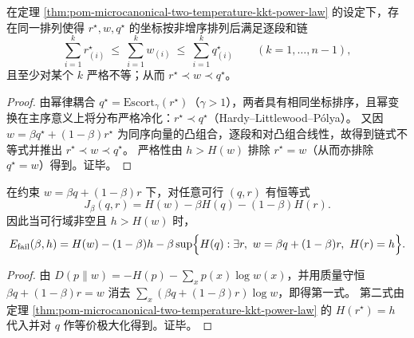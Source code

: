 \begin{corollary}\label{cor:pom-microcanonical-two-temperature-majorization-chain}
在定理 \ref{thm:pom-microcanonical-two-temperature-kkt-power-law} 的设定下，存在同一排列使得 \(r^\star,w,q^\star\) 的坐标按非增序排列后满足逐段和链
\[
\sum_{i=1}^k r^\star_{(i)}\ \le\ \sum_{i=1}^k w_{(i)}\ \le\ \sum_{i=1}^k q^\star_{(i)}\qquad(k=1,\dots,n-1),
\]
且至少对某个 \(k\) 严格不等；从而 \(r^\star\prec w\prec q^\star\)。
\end{corollary}
\begin{proof}
由幂律耦合 \(q^\star=\mathrm{Escort}_\gamma(r^\star)\)（\(\gamma>1\)），两者具有相同坐标排序，且幂变换在主序意义上将分布严格冷化：\(r^\star\prec q^\star\)（Hardy--Littlewood--Pólya）。
又因 \(w=\beta q^\star+(1-\beta)r^\star\) 为同序向量的凸组合，逐段和对凸组合线性，故得到链式不等式并推出 \(r^\star\prec w\prec q^\star\)。
严格性由 \(h>H(w)\) 排除 \(r^\star=w\)（从而亦排除 \(q^\star=w\)）得到。证毕。
\end{proof}

\begin{proposition}\label{prop:pom-microcanonical-two-temperature-js-identity}
在约束 \(w=\beta q+(1-\beta)r\) 下，对任意可行 \((q,r)\) 有恒等式
\[
J_\beta(q,r)=H(w)-\beta H(q)-(1-\beta)H(r).
\]
因此当可行域非空且 \(h>H(w)\) 时，
\[
E_{\mathrm{fail}}(\beta,h)
=H(w)-(1-\beta)h-\beta\sup\Bigl\{H(q):\exists r,\ w=\beta q+(1-\beta)r,\ H(r)=h\Bigr\}.
\]
\end{proposition}
\begin{proof}
由 \(D(p\|w)=-H(p)-\sum_x p(x)\log w(x)\)，并用质量守恒
\(
\beta q+(1-\beta)r=w
\)
消去 \(\sum_x(\beta q+(1-\beta)r)\log w\)，即得第一式。
第二式由定理 \ref{thm:pom-microcanonical-two-temperature-kkt-power-law} 的 \(H(r^\star)=h\) 代入并对 \(q\) 作等价极大化得到。证毕。
\end{proof}

